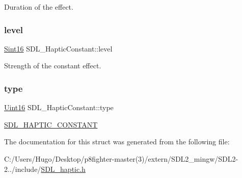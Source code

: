 Duration of the effect. \mbox{\label{struct_s_d_l___haptic_constant_a5b095eea77464623ed57af15f29f4ca6}} 
\subsubsection{\texorpdfstring{level}{level}}
{\footnotesize\ttfamily \hyperlink{_s_d_l__stdinc_8h_a9d0257032c0e146ab6121bf0122712f5}{Sint16} S\+D\+L\+\_\+\+Haptic\+Constant\+::level}

Strength of the constant effect. \mbox{\label{struct_s_d_l___haptic_constant_a5cb31202803a8bc1be95fcede5ac8afb}} 
\subsubsection{\texorpdfstring{type}{type}}
{\footnotesize\ttfamily \hyperlink{_s_d_l__stdinc_8h_a31fcc0a076c9068668173ee26d33e42b}{Uint16} S\+D\+L\+\_\+\+Haptic\+Constant\+::type}

\hyperlink{_s_d_l__haptic_8h_a955fb9f680dcf9cc72a3d5263e85b80a}{S\+D\+L\+\_\+\+H\+A\+P\+T\+I\+C\+\_\+\+C\+O\+N\+S\+T\+A\+NT} 

The documentation for this struct was generated from the following file\+:\begin{DoxyCompactItemize}
\item 
C\+:/\+Users/\+Hugo/\+Desktop/p8fighter-\/master(3)/extern/\+S\+D\+L2\+\_\+mingw/\+S\+D\+L2-\/2../include/\hyperlink{_s_d_l__haptic_8h}{S\+D\+L\+\_\+haptic.\+h}\end{DoxyCompactItemize}
